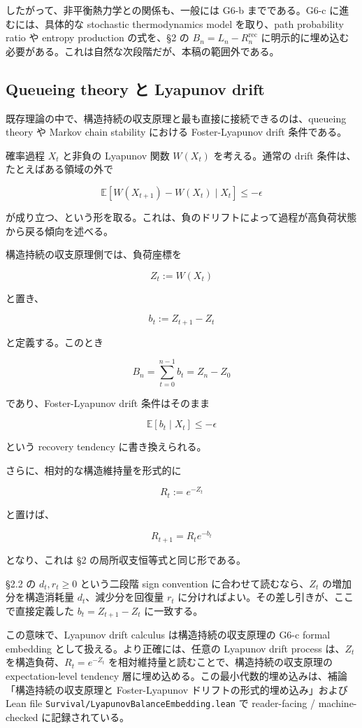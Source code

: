 \documentclass[12pt,a4paper]{article}
\begin{document}
したがって、非平衡熱力学との関係も、一般には G6-b までである。G6-c に進むには、具体的な stochastic thermodynamics model を取り、path probability ratio や entropy production の式を、§2 の \(B_{n}=L_{n}-R_{n}^{\mathrm{rec}}\) に明示的に埋め込む必要がある。これは自然な次段階だが、本稿の範囲外である。

\subsection{Queueing theory と Lyapunov drift}\label{queueing-theory-ux3068-lyapunov-drift}

既存理論の中で、構造持続の収支原理と最も直接に接続できるのは、queueing theory や Markov chain stability における Foster-Lyapunov drift 条件である。

確率過程 \(X_{t}\) と非負の Lyapunov 関数 \(W(X_{t})\) を考える。通常の drift 条件は、たとえばある領域の外で

\[
\mathbb E[W(X_{t+1})-W(X_{t})\mid X_{t}]\le -\epsilon
\]

が成り立つ、という形を取る。これは、負のドリフトによって過程が高負荷状態から戻る傾向を述べる。

構造持続の収支原理側では、負荷座標を

\[
Z_{t} := W(X_{t})
\]

と置き、

\[
b_{t} := Z_{t+1}-Z_{t}
\]

と定義する。このとき

\[
B_{n} = \sum_{t=0}^{n-1} b_{t} = Z_{n}-Z_0
\]

であり、Foster-Lyapunov drift 条件はそのまま

\[
\mathbb E[b_{t}\mid X_{t}]\le -\epsilon
\]

という recovery tendency に書き換えられる。

さらに、相対的な構造維持量を形式的に

\[
R_{t} := e^{-Z_{t}}
\]

と置けば、

\[
R_{t+1}=R_{t} e^{-b_{t}}
\]

となり、これは §2 の局所収支恒等式と同じ形である。

§2.2 の \(d_{t},r_{t}\ge 0\) という二段階 sign convention に合わせて読むなら、\(Z_{t}\) の増加分を構造消耗量 \(d_{t}\)、減少分を回復量 \(r_{t}\) に分ければよい。その差し引きが、ここで直接定義した \(b_{t}=Z_{t+1}-Z_{t}\) に一致する。

この意味で、Lyapunov drift calculus は構造持続の収支原理の G6-c formal embedding として扱える。より正確には、任意の Lyapunov drift process は、\(Z_{t}\) を構造負荷、\(R_{t}=e^{-Z_{t}}\) を相対維持量と読むことで、構造持続の収支原理の expectation-level tendency 層に埋め込める。この最小代数的埋め込みは、補論「構造持続の収支原理と Foster-Lyapunov ドリフトの形式的埋め込み」および Lean file \texttt{Survival/LyapunovBalanceEmbedding.lean} で reader-facing / machine-checked に記録されている。
\end{document}
